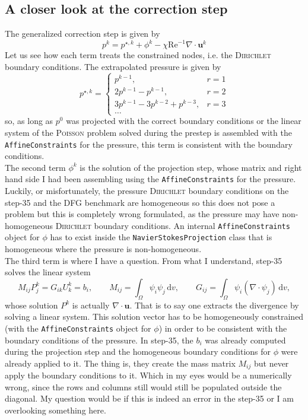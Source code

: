 \documentclass[]{scrartcl}
\renewcommand{\d}{\,\mathrm{d}}
\begin{document}
\subsection{A closer look at the correction step}
The generalized correction step is given by
\begin{equation*}
	p^{k} = p^{\star, k} + \phi^{k} - \chi\textrm{Re}^{-1} \nabla \cdot \mathbf{u}^{k}
\end{equation*}
Let us see how each term treats the constrained nodes, i.e. the \textsc{Dirichlet} boundary conditions. The extrapolated pressure is given by
\begin{equation*}
	 p^{\star, k} =
	 \begin{cases}
	 	p^{k-1}, & r = 1 \\
	 	2p^{k-1} - p^{k-1}, & r = 2 \\
	 	3p^{k-1} - 3p^{k-2} + p^{k-3}, & r = 3 \\
	 	\dots
	 \end{cases}
\end{equation*}
so, as long as  $p^0$ was projected with the correct boundary conditions or the linear system of the \textsc{Poisson} problem solved during the prestep is assembled with the \texttt{AffineConstraints} for the pressure, this term is consistent with the boundary conditions. \\
The second term $\phi^{k}$ is the solution of the projection step, whose matrix and right hand side I had been assembling using the \texttt{AffineConstraints} for the pressure. Luckily, or misfortunately, the pressure \textsc{Dirichlet} boundary conditions on the step-35 and the DFG benchmark are homogeneous so this does not pose a problem but this is completely wrong formulated, as the pressure may have non-homogeneous \textsc{Dirichlet} boundary conditions. An internal \texttt{AffineConstraints} object for $\phi$ has to exist inside the \texttt{NavierStokesProjection} class that is homogeneous where the pressure is non-homogeneous. \\
The third term is where I have a question. From what I understand, step-35 solves the linear system
\begin{equation*}
	M_{ij} P^k_j = G_{ik} U^k_k = b_{i},
	\qquad
	M_{ij} = \int_\Omega \psi_i \psi_j \d v,
	\qquad
	G_{ij} = \int_\Omega \psi_i (\nabla \cdot \psi_j) \d v,
\end{equation*}
whose solution $P^k$ is actually $\nabla\cdot\mathbf{u}$. That is to say one extracts the divergence by solving a linear system. This solution vector has to be homogeneously constrained (with the \texttt{AffineConstraints} object for $\phi$) in order to be consistent with the boundary conditions of the pressure. In step-35, the $b_i$ was already computed during the projection step and the homogeneous boundary conditions for $\phi$ were already applied to it. The thing is, they create the mass matrix $M_{ij}$ but never apply the boundary conditions to it. Which in my eyes would be a numerically wrong, since the rows and columns still would still be populated outside the diagonal. My question would be if this is indeed an error in the step-35 or I am overlooking something here.
\end{document}

